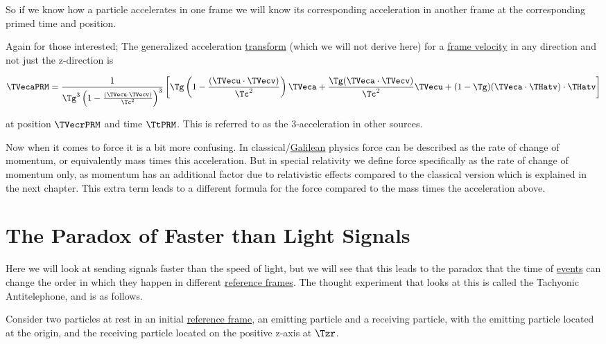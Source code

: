 So if we know how a particle accelerates in one frame we will know its corresponding acceleration in another frame at the corresponding primed time and position.

\sidenote

Again for those interested; The generalized acceleration \hyperlink{def-transform}{transform} (which we will not derive here) for a \hyperlink{def-frame-velocity}{frame velocity} in any direction and not just the z-direction is

\begin{equation}
	\TVecaPRM  = \frac{1}{ \Tg  ^3 \left(1-\frac{(\TVecu \cdot \TVecv )}{ \Tc ^2}\right)^3}\left[ \Tg  \left(1-\frac{(\TVecu \cdot\TVecv )}{ \Tc ^2}\right)\TVeca  + \frac{ \Tg  (\TVeca \cdot\TVecv )}{ \Tc ^2}\TVecu  + (1-{\Tg } ) (\TVeca \cdot\THatv ) \cdot\THatv \right]
\end{equation}

at position ${\TVecrPRM  }$ and time $\TtPRM $.
This is referred to as the 3-acceleration in other sources.

Now when it comes to force it is a bit more confusing.
In classical/\hyperlink{def-galilean-transform}{Galilean} physics force can be described as the rate of change of momentum, or equivalently mass times this acceleration.
But in special relativity we define force specifically as the rate of change of momentum only, as momentum has an additional factor due to relativistic effects compared to the classical version which is explained in the next chapter.
This extra term leads to a different formula for the force compared to the mass times the acceleration above.

\section{The Paradox of Faster than Light Signals}\label{sect: The Paradox of Faster than Light Signals}

Here we will look at sending signals faster than the speed of light, but we will see that this leads to the paradox that the time of \hyperlink{def-event}{events} can change the order in which they happen in different \hyperlink{def-Reference-frame}{reference frames}.
The thought experiment that looks at this is called the Tachyonic Antitelephone, and is as follows.

Consider two particles at rest in an initial \hyperlink{def-Reference-frame}{reference frame}, an emitting particle and a receiving particle, with the emitting particle located at the origin, and the receiving particle located on the positive z-axis at $\Tzr$.

